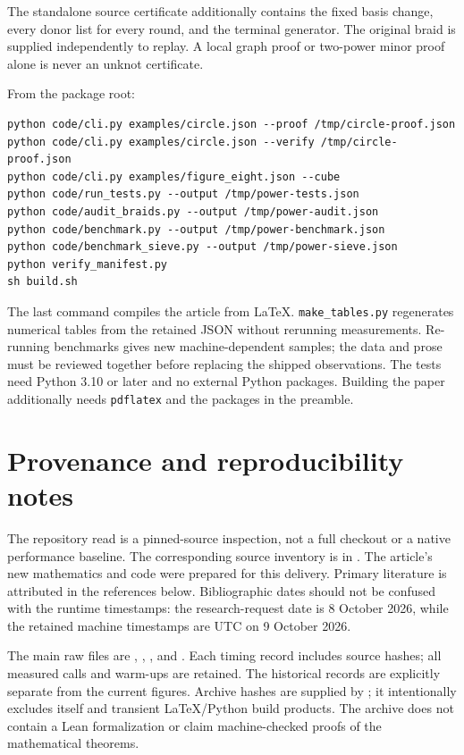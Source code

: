 \documentclass[11pt]{article}
\theoremstyle{definition}\newtheorem{definition}[theorem]{Definition}
\theoremstyle{remark}\newtheorem{remark}[theorem]{Remark}
\newcommand{\code}[1]{\texttt{#1}}
\begin{document}
The standalone source certificate additionally contains the fixed basis
change, every donor list for every round, and the terminal generator.
The original braid is supplied independently to replay. A local graph
proof or two-power minor proof alone is never an unknot certificate.

From the package root:
\begin{lstlisting}
python code/cli.py examples/circle.json --proof /tmp/circle-proof.json
python code/cli.py examples/circle.json --verify /tmp/circle-proof.json
python code/cli.py examples/figure_eight.json --cube
python code/run_tests.py --output /tmp/power-tests.json
python code/audit_braids.py --output /tmp/power-audit.json
python code/benchmark.py --output /tmp/power-benchmark.json
python code/benchmark_sieve.py --output /tmp/power-sieve.json
python verify_manifest.py
sh build.sh
\end{lstlisting}
The last command compiles the article from LaTeX. \code{make\_tables.py}
regenerates numerical tables from the retained JSON without rerunning
measurements. Re-running benchmarks gives new machine-dependent samples;
the data and prose must be reviewed together before replacing the shipped
observations. The tests need Python 3.10 or later and no external Python
packages. Building the paper additionally needs \code{pdflatex} and the
packages in the preamble.

\section{Provenance and reproducibility notes}
The repository read is a pinned-source inspection, not a full checkout
or a native performance baseline. The corresponding source inventory is
in . The article's new mathematics and
code were prepared for this delivery. Primary literature is attributed
in the references below. Bibliographic dates should not be confused with
the runtime timestamps: the research-request date is 8 October 2026,
while the retained machine timestamps are UTC on 9 October 2026.

The main raw files are ,
, , and
. Each timing record includes source hashes;
all measured calls and warm-ups are retained. The historical records are
explicitly separate from the current figures. Archive hashes are supplied
by ; it intentionally excludes itself and transient
LaTeX/Python build products. The archive does not contain a Lean
formalization or claim machine-checked proofs of the mathematical theorems.
\end{document}
